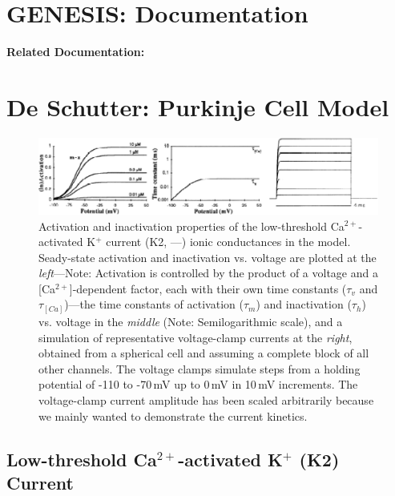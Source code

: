 \documentclass[12pt]{article}
\begin{document}
\section*{GENESIS: Documentation}

{\bf Related Documentation:}

\section*{De Schutter: Purkinje Cell Model}

\begin{figure}[h]
\centering
   \includegraphics[scale=0.75]{figures/DS1.2H.eps}
   \caption{Activation and inactivation properties of the low-threshold Ca$^{2+}$-activated K$^+$ current (K2, ---) ionic conductances in the model. Seady-state activation and inactivation vs. voltage are plotted at the {\em left}---Note: Activation is controlled by the product of a voltage and a [Ca$^{2+}$]-dependent factor, each with their own time constants ($\tau_v$ and $\tau_{[Ca]}$)---the time constants of activation ($\tau_m$) and inactivation ($\tau_h$) vs. voltage in the {\em middle} (Note: Semilogarithmic scale), and a simulation of representative voltage-clamp currents at the {\em right}, obtained from a spherical cell and assuming a complete block of all other channels. The voltage clamps simulate steps from a holding potential of -110 to -70\,mV up to 0\,mV in 10\,mV increments. The voltage-clamp current amplitude has been scaled arbitrarily because we mainly wanted to demonstrate the current kinetics.}
   \label{fig:DS1.2H}
\end{figure}

\subsection*{Low-threshold Ca$^{2+}$-activated K$^+$ (K2) Current}
\end{document}
